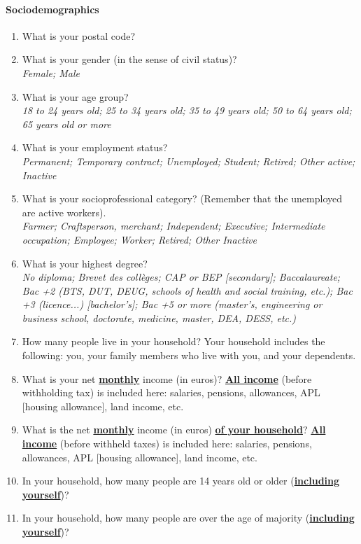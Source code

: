 \documentclass[12pt]{article} %
\begin{document}
\begin{appendices}
\paragraph{Sociodemographics}
\begin{enumerate}[resume,leftmargin=*]
\item What is your postal code? 
\item What is your gender (in the sense of civil status)? \emph{}\\
\emph{Female; Male }
\item What is your age group? \emph{}\\
\emph{18 to 24 years old; 25 to 34 years old; 35 to 49 years old;
50 to 64 years old; 65 years old or more} 
\item What is your employment status? \emph{}\\
\emph{Permanent; Temporary contract; Unemployed; Student; Retired;
Other active; Inactive}
\item What is your socioprofessional category? (Remember that the unemployed
are active workers). \emph{}\\
\emph{Farmer; Craftsperson, merchant; Independent; Executive; Intermediate
occupation; Employee; Worker; Retired; Other Inactive} 
\item What is your highest degree? \emph{}\\
\emph{No diploma; Brevet des collèges; CAP or BEP {[}secondary{]};
Baccalaureate; Bac +2 (BTS, DUT, DEUG, schools of health and social
training, etc.); Bac +3 (licence...) {[}bachelor's{]}; Bac +5 or more (master's,
engineering or business school, doctorate, medicine, master, DEA,
DESS, etc.)}
\item How many people live in your household? Your household includes the following: you, your
family members who live with you, and your dependents. 
\item What is your net \textbf{\underline{monthly}} income (in euros)? \textbf{\underline{All
income}} (before withholding tax) is included here: salaries, pensions,
allowances, APL {[}housing allowance{]}, land income, etc. 
\item What is the net \textbf{\underline{monthly}} income (in euros) \textbf{\underline{of
your household}}? \textbf{\underline{All income}} (before withheld
taxes) is included here: salaries, pensions, allowances, APL {[}housing
allowance{]}, land income, etc. 
\item In your household, how many people are 14 years old or older (\textbf{\underline{including
yourself}})? 
\item In your household, how many people are over the age of majority
(\textbf{\underline{including
yourself}})? 
\end{enumerate}


\end{appendices}
\end{document}
